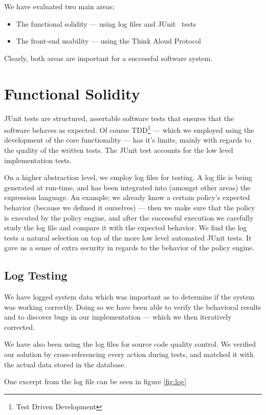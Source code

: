We have evaluated two main areas;
\begin{itemize}
	\item The functional solidity --- using log files and JUnit~\cite{junit} tests
	\item The front-end usability --- using the Think Aloud Protocol
\end{itemize}

Clearly, both areas are important for a successful software system. 

\section{Functional Solidity}\label{policy-engine-system-evaluation}
JUnit tests are structured, assertable software tests that ensures that the software behaves as expected. Of course TDD\footnote{Test Driven Development} --- which we employed using the development of the core functionality --- has it's limits, mainly with regards to the quality of the written tests. The JUnit test accounts for the low level implementation tests.

On a higher abstraction level, we employ log files for testing. A log file is being generated at run-time, and has been integrated into (amongst other areas) the expression language. An example; we already know a certain policy's expected behavior (because we defined it ourselves) --- then we make sure that the policy is executed by the policy engine, and after the successful execution we carefully study the log file and compare it with the expected behavior. We find the log tests a natural selection on top of the more low level automated JUnit tests. It gave us a sense of extra security in regards to the behavior of the policy engine.

\subsection{Log Testing}
\label{log-test}
We have logged system data which was important as to determine if the system was working correctly. Doing so we have been able to verify the behavioral results and to discover bugs in our implementation --- which we then iteratively corrected. 

We have also been using the log files for source code quality control. We verified our solution by cross-referencing every action during tests, and matched it with the actual data stored in the database.

One excerpt from the log file can be seen in figure \ref{fig:log}


